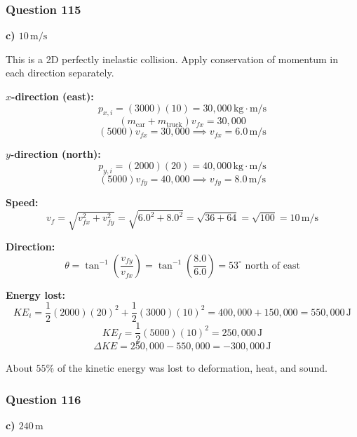 \documentclass[12pt,letterpaper]{article}
\begin{document}
\subsubsection*{Question 115}

\begin{answerbox}
\textbf{c) $10\,\text{m/s}$}
\end{answerbox}

\begin{explanationbox}
This is a 2D perfectly inelastic collision. Apply conservation of momentum in each direction separately.

\textbf{$x$-direction (east):}
\[
p_{x,i} = (3000)(10) = 30{,}000\,\text{kg}\cdot\text{m/s}
\]
\[
(m_{\text{car}} + m_{\text{truck}})v_{fx} = 30{,}000
\]
\[
(5000)v_{fx} = 30{,}000 \implies v_{fx} = 6.0\,\text{m/s}
\]

\textbf{$y$-direction (north):}
\[
p_{y,i} = (2000)(20) = 40{,}000\,\text{kg}\cdot\text{m/s}
\]
\[
(5000)v_{fy} = 40{,}000 \implies v_{fy} = 8.0\,\text{m/s}
\]

\textbf{Speed:}
\[
v_f = \sqrt{v_{fx}^2 + v_{fy}^2} = \sqrt{6.0^2 + 8.0^2} = \sqrt{36 + 64} = \sqrt{100} = 10\,\text{m/s}
\]

\textbf{Direction:}
\[
\theta = \tan^{-1}\left(\frac{v_{fy}}{v_{fx}}\right) = \tan^{-1}\left(\frac{8.0}{6.0}\right) = 53^\circ \text{ north of east}
\]

\textbf{Energy lost:}
\[
KE_i = \frac{1}{2}(2000)(20)^2 + \frac{1}{2}(3000)(10)^2 = 400{,}000 + 150{,}000 = 550{,}000\,\text{J}
\]
\[
KE_f = \frac{1}{2}(5000)(10)^2 = 250{,}000\,\text{J}
\]
\[
\Delta KE = 250{,}000 - 550{,}000 = -300{,}000\,\text{J}
\]

About $55\%$ of the kinetic energy was lost to deformation, heat, and sound.
\end{explanationbox}

\subsubsection*{Question 116}

\begin{answerbox}
\textbf{c) $240\,\text{m}$}
\end{answerbox}
\end{document}
